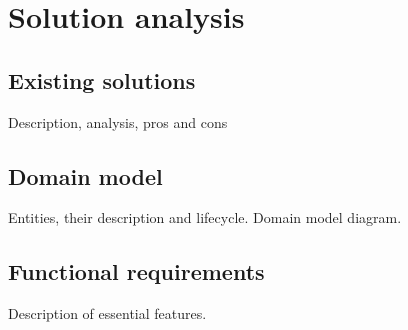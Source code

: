 
\chapter{Solution analysis}\label{ch:solution-analysis}

\section{Existing solutions}\label{sec:existing-solutions}
{\color{gray} Description, analysis, pros and cons}

\section{Domain model}\label{sec:domain-model}
{\color{gray} Entities, their description and lifecycle. Domain model diagram.}

\section{Functional requirements}\label{sec:functional-requirements}
{\color{gray} Description of essential features.}

